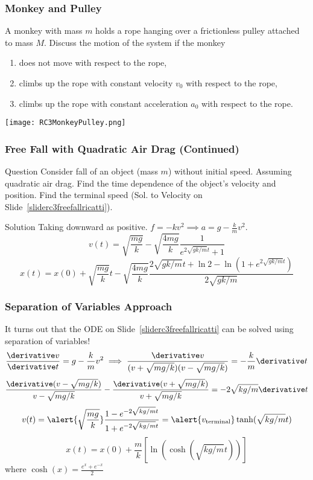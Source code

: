 \begin{frame}
\frametitle{Monkey and Pulley}
A monkey with \alert{mass} $m$ holds a rope hanging over a frictionless pulley attached to mass $M$. Discuss the motion of the system if the monkey
\begin{enumerate}
\item does not move with respect to the rope,
\item climbs up the rope with constant velocity $v_0$ with respect to the rope,
\item climbs up the rope with constant acceleration $a_0$ with respect to the rope.
\end{enumerate}
\texttt{[image: RC3MonkeyPulley.png]}
\end{frame}
\begin{frame}
\frametitle{Free Fall with Quadratic Air Drag (Continued)}
\begin{block}{Question}
Consider fall of an object (mass $m$) without initial speed. Assuming \alert{quadratic} air drag. Find the time dependence of the object's velocity and position. Find the \alert{terminal} speed (Sol. to Velocity on Slide~\ref{sliderc3freefallricatti}).
\end{block}
\begin{block}{Solution}
Taking downward as positive. $f=-kv^2\implies a=g-\frac{k}{m}v^2$.
\[
v(t)=\sqrt{\frac{mg}{k}}-\sqrt{\frac{4mg}{k}}\frac{1}{e^{2\sqrt{gk/m}t}+1}
\]
\[
x(t)=x(0)+\sqrt{\frac{mg}{k}}t-\sqrt{\frac{4mg}{k}}\frac{2\sqrt{gk/m}t+\ln 2-\ln (1+e^{2\sqrt{gk/m}t})}{2\sqrt{gk/m}}
\]
\end{block}
\end{frame}
\begin{frame}
\frametitle{Separation of Variables Approach}
It turns out that the ODE on Slide~\ref{sliderc3freefallricatti} can be solved using \alert{separation of variables}!
\[\frac{\derivative v}{\derivative t}=g-\frac{k}{m}v^2\implies \frac{\derivative v}{(v+\sqrt{mg/k})(v-\sqrt{mg/k})}=-\frac{k}{m}\derivative t\]
\[\frac{\derivative(v-\sqrt{mg/k})}{v-\sqrt{mg/k}}-\frac{\derivative (v+\sqrt{mg/k})}{v+\sqrt{mg/k}}=-2\sqrt{kg/m}\derivative t\]
\[v(t)=\alert{\sqrt{\frac{mg}{k}}}\frac{1-e^{-2\sqrt{kg/m}t}}{1+e^{-2\sqrt{kg/m}t}}=\alert{v_{\text{terminal}}}\tanh(\sqrt{kg/m}t)\]
\[x(t)=x(0)+\frac{m}{k}\left[\ln(\cosh(\sqrt{kg/m}t))\right]\]
where $\cosh(x)=\frac{e^{x}+e^{-x}}{2}$
\end{frame}
